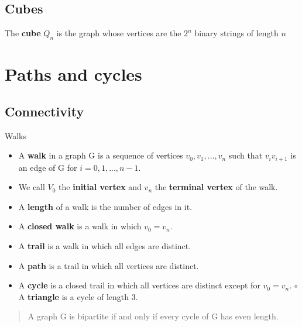 \documentclass[12pt,a4paper]{ctexart}
\begin{document}
\subsection{Cubes}
The \textbf{cube} $Q_n$ is the graph whose vertices are the $2^n$ binary strings of length $n$





\section{Paths and cycles}
\subsection{Connectivity}
\begin{center}
    \colorbox{mygrey}{\color{myred}Walks}
    \begin{itemize}
        \item A \textbf{walk} in a graph G is a sequence of vertices $v_0,v_1,...,v_n$ such that $v_iv_{i+1}$ is an edge of G for $i=0,1,...,n-1$.
        \item We call $V_0$ the \textbf{initial vertex} and $v_n$ the \textbf{terminal vertex} of the walk.
        \item A \textbf{length} of a walk is the number of edges in it.
        \item A \textbf{closed walk} is a walk in which $v_0=v_n$.
        \item A \textbf{trail} is a walk in which all \textcolor{myred}{edges} are distinct.
        \item A \textbf{path} is a trail in which all \textcolor{myred}{vertices} are distinct.
        \item A \textbf{cycle} is a closed trail in which all vertices are distinct except for $v_0=v_n$.
        \subitem $\circ$ A \textbf{triangle} is a cycle of length 3.
    \end{itemize}

\end{center}

\begin{quote}
    A graph G is bipartite if and only if every cycle of G has even length.
\end{quote}
\end{document}
